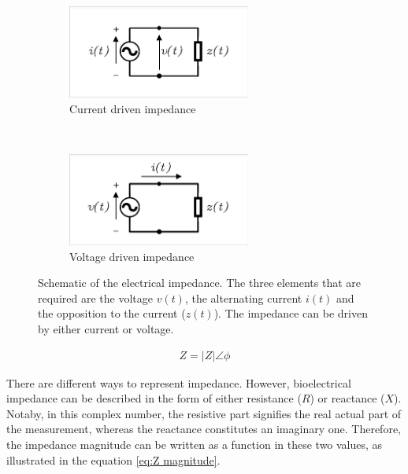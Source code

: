 \begin{figure}[!htpb]
	\centering
	\begin{subfigure}[t]{0.4\textwidth}
		\centering
		\includegraphics[width=6cm,trim={0.05cm 0.05cm 0.05cm 0.15cm},clip,keepaspectratio]{figure0a}    
		\caption{Current driven impedance}
		\label{fig:impedance a}
	\end{subfigure}
	~
	\begin{subfigure}[t]{0.4\textwidth}
		\centering
		\includegraphics[width=6cm,trim={0.05cm 0.05cm 0.05cm 0.15cm},clip,keepaspectratio]{figure0b}    
		\caption{Voltage driven impedance}
		\label{fig:impedance b}
	\end{subfigure}
	\caption[Impedance representation from two-terminal element]{Schematic of the electrical impedance. The three elements that are required are the voltage $v(t)$, the alternating current $i(t)$ and the opposition to the current ($z(t)$). The impedance can be driven by either current or voltage.}
	\label{fig:impedance}
\end{figure}

\begin{align}
	\label{eq:phasor}
	Z = \lvert Z \rvert  \angle \phi
\end{align}

There are different ways to represent impedance. However, bioelectrical impedance can be described in the form of either resistance ($R$) or reactance ($X$). Notaby, in this complex number, the resistive part signifies the real actual part of the measurement, whereas the reactance constitutes an imaginary one. Therefore, the impedance magnitude can be written as a function in these two values, as illustrated in the equation \ref{eq:Z magnitude}.

